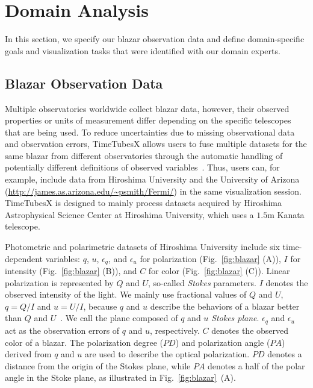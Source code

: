 \section{Domain Analysis}\label{sec:domainAnalysis}
In this section, we specify our blazar observation data and define domain-specific goals and visualization tasks that were identified with our domain experts. 

\subsection{Blazar Observation Data}\label{sec:BlazarData}
Multiple observatories worldwide collect blazar data, however, their observed properties or units of measurement differ depending on the specific telescopes that are being used. 
To reduce uncertainties due to missing observational data and observation errors,
TimeTubesX allows users to fuse multiple datasets for the same blazar from different observatories 
through the automatic handling of potentially different definitions of observed variables~\cite{Fujishiro2018}.
Thus, users can, for example, include data from Hiroshima University and the University of Arizona (\url{http://james.as.arizona.edu/~psmith/Fermi/}) in the same visualization session. 
TimeTubesX is designed to mainly process datasets acquired by Hiroshima Astrophysical Science Center at Hiroshima University,
which uses a $1.5\mathrm{m}$ Kanata telescope. 

Photometric and polarimetric datasets of Hiroshima University include six time-dependent variables: $q$, $u$, $\epsilon_q$, and $\epsilon_u$ for polarization (Fig.~\ref{fig:blazar} (A)), $I$ for intensity (Fig.~\ref{fig:blazar} (B)), and $C$ for color (Fig.~\ref{fig:blazar} (C)).
Linear polarization is represented by $Q$ and $U$, so-called \textit{Stokes} parameters.
$I$ denotes the observed intensity of the light.
We mainly use fractional values of $Q$ and $U$, $q = Q / I$ and $u = U / I$, 
because $q$ and $u$ describe the behaviors of a blazar better than $Q$ and $U$~\cite{Uemura2016}.
We call the plane composed of $q$ and $u$ \textit{Stokes plane}.
$\epsilon_q$ and $\epsilon_u$ act as the observation errors of $q$ and $u$, respectively.
$C$ denotes the observed color of a blazar.
The polarization degree ($PD$) and polarization angle ($PA$) derived from $q$ and $u$ are used to describe the optical polarization.
$PD$ denotes a distance from the origin of the Stokes plane, 
while $PA$ denotes a half of the polar angle in the Stoke plane, as illustrated in Fig.~\ref{fig:blazar}~(A).

